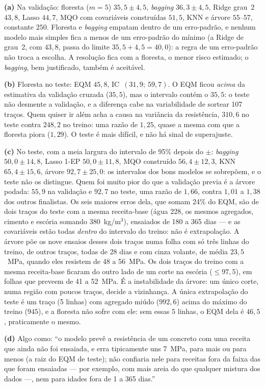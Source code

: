 \documentclass[11pt,a4paper]{article}
\begin{document}
\begin{solucao}
\textbf{(a)} Na validação: floresta ($m=5$) $35{,}5\pm4{,}5$, \emph{bagging}
$36{,}3\pm4{,}5$, Ridge grau~2 $43{,}8$, Lasso $44{,}7$, MQO com covariáveis
construídas $51{,}5$, KNN e árvore $55$--$57$, constante $250$. Floresta e
\emph{bagging} empatam dentro de um erro-padrão, e nenhum modelo mais simples fica a
menos de um erro-padrão do mínimo (a Ridge de grau~2, com $43{,}8$, passa do limite
$35{,}5+4{,}5=40{,}0$): a regra de um erro-padrão não troca a escolha. A resolução
fica com a floresta, o menor risco estimado; o \emph{bagging}, bem justificado, também
é aceitável.

\textbf{(b)} Floresta no teste: EQM $45{,}8$, IC~$(31{,}9;\ 59{,}7)$. O EQM ficou
\emph{acima} da estimativa da validação cruzada ($35{,}5$), mas o intervalo contém o
$35{,}5$: o teste não desmente a validação, e a diferença cabe na variabilidade de
sortear 107 traços. Quem quiser ir além acha a causa na variância da resistência,
$310{,}6$ no teste contra $248{,}2$ no treino: uma razão de $1{,}25$, quase a mesma com
que a floresta piora ($1{,}29$). O teste é mais difícil, e não há sinal de superajuste.

\textbf{(c)} No teste, com a meia largura do intervalo de 95\% depois do $\pm$:
\emph{bagging} $50{,}0\pm14{,}8$, Lasso 1-EP $50{,}0\pm11{,}8$, MQO
construído $56{,}4\pm12{,}3$, KNN $65{,}4\pm15{,}6$, árvore $92{,}7\pm25{,}0$: os
intervalos dos bons modelos se sobrepõem, e o teste não os distingue. Quem foi muito
pior do que a validação previa é a árvore podada: $55{,}9$ na validação e $92{,}7$ no
teste, uma razão de $1{,}66$, contra $1{,}01$ a $1{,}38$ dos outros finalistas. Os seis
maiores erros dela, que somam 24\% do EQM, são de dois traços do teste com a mesma
receita-base (água 228, os mesmos agregados, cimento e escória somando
380~kg/m$^3$), ensaiados de 180 a 365 dias --- e as covariáveis estão todas
\emph{dentro} do intervalo do treino: não é extrapolação. A árvore põe os nove
ensaios desses dois traços numa folha com só três linhas do treino, de outros traços,
todas de 28 dias e com cinza volante, de média $23{,}5$~MPa, quando eles resistem de
48 a 56~MPa. Os dois traços do treino com a mesma receita-base ficaram do outro lado
de um corte na escória ($\le97{,}5$), em folhas que preveem de 41 a 52~MPa. É a
instabilidade da árvore: um único corte, numa região com poucos traços, decide a
vizinhança. A única extrapolação do teste é um traço (5 linhas) com agregado miúdo
($992{,}6$) acima do máximo do treino ($945$), e a floresta não sofre com ele: sem essas
5 linhas, o EQM dela é $46{,}5$, praticamente o mesmo.

\textbf{(d)} Algo como: ``o modelo prevê a resistência de um concreto com uma receita
que ainda não foi ensaiada, e erra tipicamente uns 7~MPa, para mais ou para menos (a
raiz do EQM de teste); não confiaria nele para receitas fora da faixa das que foram
ensaiadas --- por exemplo, com mais areia do que qualquer mistura dos dados ---, nem
para idades fora de 1 a 365 dias.''
\end{solucao}
\end{document}
